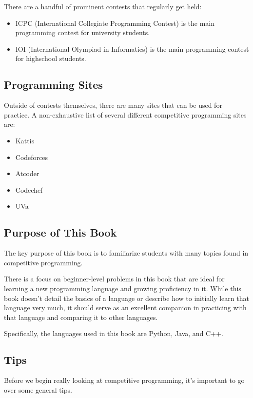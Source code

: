 There are a handful of prominent contests that regularly get held:

\begin{itemize}
\item ICPC (International Collegiate Programming Contest) is the main programming contest for university students.
\item IOI (International Olympiad in Informatics) is the main programming contest for highschool students.
\end{itemize}

\subsection{Programming Sites}

Outside of contests themselves, there are many sites that can be used for practice. A non-exhaustive list of several different competitive programming sites are:

\begin{itemize}
\item Kattis
\item Codeforces
\item Atcoder
\item Codechef
\item UVa
\end{itemize}

\subsection{Purpose of This Book}

The key purpose of this book is to familiarize students with many topics found in competitive programming.

There is a focus on beginner-level problems in this book that are ideal for learning a new programming language and growing proficiency in it. While this book doesn't detail the basics of a language or describe how to initially learn that language very much, it should serve as an excellent companion in practicing with that language and comparing it to other languages.

Specifically, the languages used in this book are Python, Java, and C++.

\subsection{Tips}

Before we begin really looking at competitive programming, it's important to go over some general tips.

